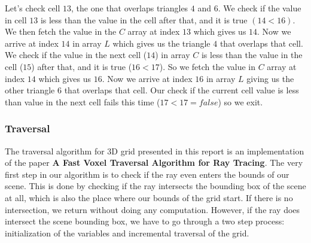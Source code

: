 \documentclass[11pt,a4paper]{article}
\begin{document}
\noindent
Let's check cell $13$, the one that overlaps triangles $4$ and $6$. We check if the value in cell $13$ is less than the value in the cell after that, and it is true $(14 < 16)$. We then fetch the value in the $C$ array at index $13$ which gives us $14$. Now we arrive at index $14$ in array $L$ which gives us the triangle $4$ that overlaps that cell. We check if the value in the next cell ($14$) in array $C$ is less than the value in the cell ($15$) after that, and it is true ($16 < 17$). So we fetch the value in $C$ array at index $14$ which gives us $16$. Now we arrive at index $16$ in array $L$ giving us the other triangle $6$ that overlaps that cell. Our check if the current cell value is less than value in the next cell fails this time ($17 < 17 = false$) so we exit.
\subsubsection{Traversal}

The  traversal algorithm for 3D grid presented in this report is an implementation of the paper \textbf{A Fast Voxel Traversal Algorithm for Ray Tracing}\cite{amanatides1987fast}. The very first step in our algorithm is to check if the ray even enters the bounds of our scene. This is done by checking if the ray intersects the bounding box of the scene at all, which is also the place where our bounds of the grid start. If there is no intersection, we return without doing any computation. However, if the ray does intersect the scene bounding box, we have to go through a two step process: initialization of the variables and incremental traversal of the grid. 
\end{document}
